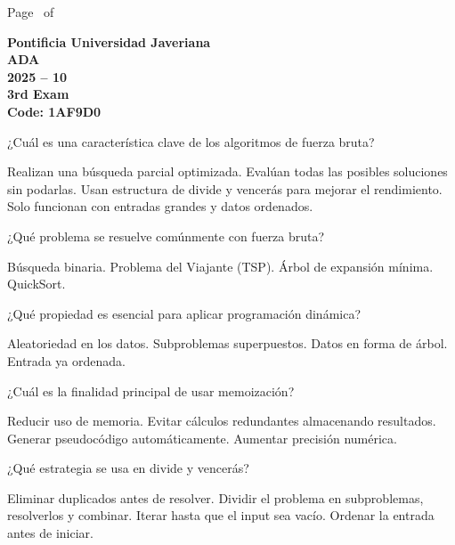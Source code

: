 \documentclass[11pt, answers, addpoints]{exam}
\begin{document}
\begin{coverpages}
\begin{center}
			\vspace{3mm}
			\leavevmode \hspace{5mm} 
		\end{center}
	\end{coverpages}

	\footer{} {Page \thepage\ of \numpages} {}

	\centering
	\textbf{\Large Pontificia Universidad Javeriana}\\
	\textbf{\Large ADA} \\
	\textbf{\large 2025 -- 10} \\
	\textbf{\large 3rd Exam} \\
	\textbf{Code: 1AF9D0}


\begin{questions}

\question ¿Cuál es una característica clave de los algoritmos de fuerza bruta?
\begin{choices}
\choice Realizan una búsqueda parcial optimizada.
\CorrectChoice Evalúan todas las posibles soluciones sin podarlas.
\choice Usan estructura de divide y vencerás para mejorar el rendimiento.
\choice Solo funcionan con entradas grandes y datos ordenados.
\end{choices}

\question ¿Qué problema se resuelve comúnmente con fuerza bruta?
\begin{choices}
\choice Búsqueda binaria.
\CorrectChoice Problema del Viajante (TSP).
\choice Árbol de expansión mínima.
\choice QuickSort.
\end{choices}

\question ¿Qué propiedad es esencial para aplicar programación dinámica?
\begin{choices}
\choice Aleatoriedad en los datos.
\CorrectChoice Subproblemas superpuestos.
\choice Datos en forma de árbol.
\choice Entrada ya ordenada.
\end{choices}

\question ¿Cuál es la finalidad principal de usar memoización?
\begin{choices}
\choice Reducir uso de memoria.
\CorrectChoice Evitar cálculos redundantes almacenando resultados.
\choice Generar pseudocódigo automáticamente.
\choice Aumentar precisión numérica.
\end{choices}

\question ¿Qué estrategia se usa en divide y vencerás?
\begin{choices}
\choice Eliminar duplicados antes de resolver.
\CorrectChoice Dividir el problema en subproblemas, resolverlos y combinar.
\choice Iterar hasta que el input sea vacío.
\choice Ordenar la entrada antes de iniciar.
\end{choices}


\end{questions}
\end{document}
